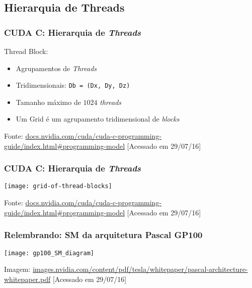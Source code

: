 \documentclass[10pt, compress, aspectratio=43, xcolor={table,usenames,dvipsnames}]{beamer}
\begin{document}
\subsection{Hierarquia de Threads}

\begin{frame}
    \frametitle{CUDA C: Hierarquia de \textit{Threads}}
    \alert{Thread Block}:
    \begin{itemize}
        \item Agrupamentos de \textit{Threads}
        \item \alert{Tridimensionais}: \texttt{\footnotesize{Db = (Dx, Dy, Dz)}}
        \item Tamanho \alert{máximo} de $1024$ \textit{threads}
        \item Um \alert{Grid} é um agrupamento tridimensional de \textit{blocks}
    \end{itemize}

    \vfill

    \begin{center}
        \tiny{Fonte: \url{docs.nvidia.com/cuda/cuda-c-programming-guide/index.html\#programming-model} [Acessado em 29/07/16]}
    \end{center}
\end{frame}

\begin{frame}
    \frametitle{CUDA C: Hierarquia de \textit{Threads}}
    \centering
    \texttt{[image: grid-of-thread-blocks]}

    \tiny{Fonte: \url{docs.nvidia.com/cuda/cuda-c-programming-guide/index.html\#programming-model} [Acessado em 29/07/16]}
\end{frame}

\begin{frame}
    \frametitle{Relembrando: SM da arquitetura Pascal GP100}
    \centering
    \texttt{[image: gp100\_SM\_diagram]}

    \vfill

    \tiny{Imagem: \url{images.nvidia.com/content/pdf/tesla/whitepaper/pascal-architecture-whitepaper.pdf} [Acessado em 29/07/16]}
\end{frame}
\end{document}
